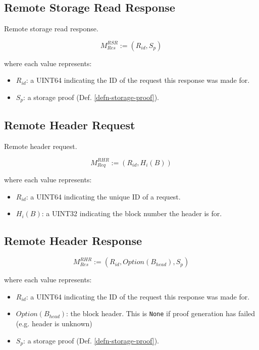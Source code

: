 \documentclass{book}
\begin{document}
\subsection{Remote Storage Read Response}

Remote storage read response.

\[
    M^{RSR}_{Res} := (R_{id}, S_p)
\]

where each value represents:

\begin{itemize}
    \item $R_{id}$: a UINT64 indicating the ID of the request this response was
    made for.
    \item $S_p$: a storage proof (Def. \ref{defn-storage-proof}).
\end{itemize}

\subsection{Remote Header Request}

Remote header request.

\[
    M^{RHR}_{Req} := (R_{id}, H_i(B))
\]

where each value represents:

\begin{itemize}
    \item $R_{id}$: a UINT64 indicating the unique ID of a request.
    \item $H_i(B)$: a UINT32 indicating the block number the header is for.
\end{itemize}

\subsection{Remote Header Response}

\[
    M^{RHR}_{Res} := (R_{id}, Option(B_{head}), S_p)
\]

where each value represents:

\begin{itemize}
    \item $R_{id}$: a UINT64 indicating the ID of the request this response was
    made for.
    \item $Option(B_{head})$: the block header. This is \verb|None| if proof generation
    has failed (e.g. header is unknown)
    \item $S_p$: a storage proof (Def. \ref{defn-storage-proof}).
\end{itemize}
\end{document}
